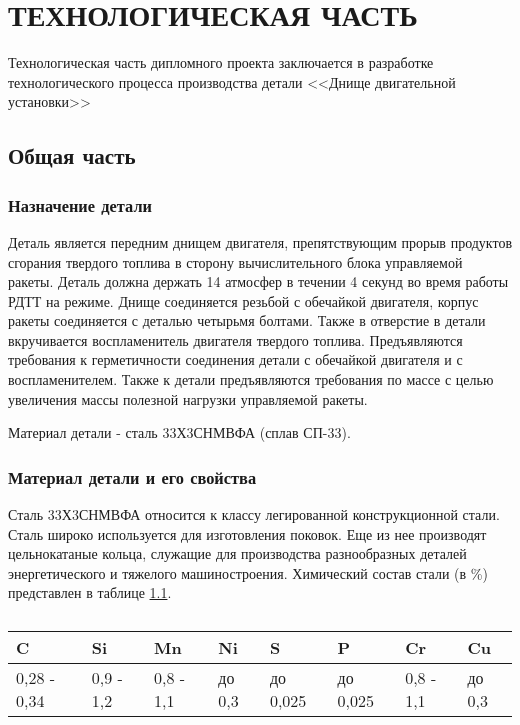 \chapter{ТЕХНОЛОГИЧЕСКАЯ ЧАСТЬ}
\label{cha:ch_3}

Технологическая часть дипломного проекта заключается в разработке технологического процесса производства детали <<Днище двигательной установки>>

\section{Общая часть}

\subsection{Назначение детали}
Деталь является передним днищем двигателя, препятствующим прорыв продуктов сгорания твердого топлива в сторону вычислительного блока управляемой ракеты. Деталь должна держать 14 атмосфер в течении 4 секунд во время работы РДТТ на режиме. Днище соединяется резьбой с обечайкой двигателя, корпус ракеты соединяется с деталью четырьмя болтами. Также в отверстие в детали вкручивается воспламенитель двигателя твердого топлива.
Предъявляются требования к герметичности соединения детали с обечайкой двигателя и с воспламенителем. Также к детали предъявляются требования по массе с целью увеличения массы полезной нагрузки управляемой ракеты.

Материал детали - сталь 33Х3СНМВФА (сплав СП-33).

\subsection{Материал детали и его свойства}
Сталь 33Х3СНМВФА относится к классу легированной конструкционной стали. Сталь широко используется для изготовления поковок. Еще из нее производят цельнокатаные кольца, служащие для производства разнообразных деталей энергетического и тяжелого машиностроения.
Химический состав стали (в \%) представлен в таблице \ref{tab:techno_steel}.
\begin{table}[h]
	\begin{center}
		\caption{}
		\begin{tabular}{|l|l|l|l|l|l|l|l|}
		\hline
C & Si & Mn & Ni & S & P & Cr & Cu \\ \hline
0,28 - 0,34 & 0,9 - 1,2 & 0,8 - 1,1 & до   0,3 & до   0,025 & до   0,025 & 0,8 - 1,1 & до   0,3 \\ \hline
		\end{tabular}
		\label{tab:techno_steel}
	\end{center}
\end{table}

